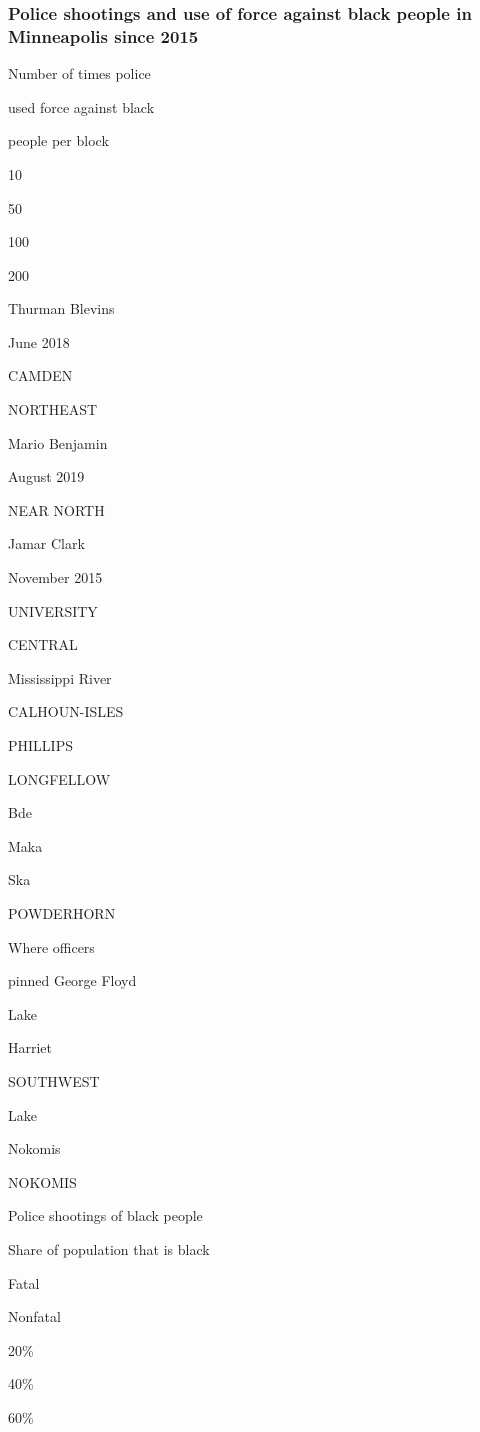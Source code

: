 \hypertarget{police-shootings-and-use-of-force-against-black-people-in-minneapolis-since-2015}{%
\subsubsection{Police shootings and use of force against black people in
Minneapolis since
2015}\label{police-shootings-and-use-of-force-against-black-people-in-minneapolis-since-2015}}

Number of times police

used force against black

people per block

10

50

100

200

Thurman Blevins

June 2018

CAMDEN

NORTHEAST

Mario Benjamin

August 2019

NEAR NORTH

Jamar Clark

November 2015

UNIVERSITY

CENTRAL

Mississippi River

CALHOUN-ISLES

PHILLIPS

LONGFELLOW

Bde

Maka

Ska

POWDERHORN

Where officers

pinned George Floyd

Lake

Harriet

SOUTHWEST

Lake

Nokomis

NOKOMIS

Police shootings of black people

Share of population that is black

Fatal

Nonfatal

20\%

40\%

60\%

